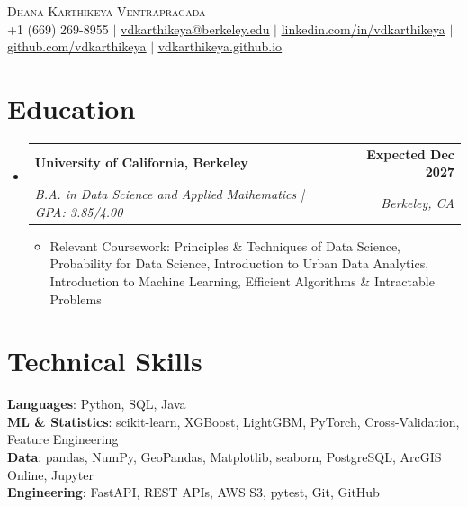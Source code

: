 \documentclass[letterpaper,11pt]{article}
\makeatletter
\newcommand{\resumeItem}[1]{%
  \item\small{{#1\vspace{-2pt}}}%
}
\newcommand{\resumeSubheading}[4]{
  \vspace{-2pt}\item
    \begin{tabular*}{1.0\textwidth}[t]{l@{\extracolsep{\fill}}r}
      \textbf{#1} & \textbf{\small #2} \\
      \textit{\small#3} & \textit{\small #4} \\
    \end{tabular*}\vspace{-7pt}
}
\newcommand{\resumeSubHeadingListStart}{\begin{itemize}[leftmargin=0.0in, label={}]}
\newcommand{\resumeSubHeadingListEnd}{\end{itemize}}
\newcommand{\resumeItemListStart}{\begin{itemize}[itemsep=2.5pt, topsep=3pt]}
\newcommand{\resumeItemListEnd}{\end{itemize}\vspace{-4pt}}
\makeatother
\begin{document}
\begin{center}
    {\Huge \scshape Dhana Karthikeya Ventrapragada} \\ \vspace{1pt}
        \footnotesize
    +1 (669) 269-8955 $|$
    \href{mailto:vdkarthikeya@berkeley.edu}{\uline{vdkarthikeya@berkeley.edu}} $|$
    \href{https://www.linkedin.com/in/vdkarthikeya/}{\uline{linkedin.com/in/vdkarthikeya}} $|$
    \href{https://github.com/vdkarthikeya}{\uline{github.com/vdkarthikeya}} $|$
    \href{https://vdkarthikeya.github.io}{\uline{vdkarthikeya.github.io}}
    \vspace{-8pt}
\end{center}

\section{Education}
\resumeSubHeadingListStart

\resumeSubheading
{University of California, Berkeley}{Expected Dec 2027}
{B.A. in Data Science and Applied Mathematics \;|\; GPA: 3.85/4.00}{Berkeley, CA}

\vspace{-6pt}
\resumeItemListStart
\resumeItem{Relevant Coursework: Principles \& Techniques of Data Science, Probability for Data Science, Introduction to Urban Data Analytics, Introduction to Machine Learning, Efficient Algorithms \& Intractable Problems}
\resumeItemListEnd

\resumeSubHeadingListEnd
\vspace{-14pt}

\section{Technical Skills}
 \begin{itemize}[leftmargin=0.15in, label={}, itemsep=3pt]
    \small{\item{
     \textbf{Languages}{: Python, SQL, Java} \\[2pt]
     \textbf{ML \& Statistics}{: scikit-learn, XGBoost, LightGBM, PyTorch, Cross-Validation, Feature Engineering} \\[2pt]
     \textbf{Data}{: pandas, NumPy, GeoPandas, Matplotlib, seaborn, PostgreSQL, ArcGIS Online, Jupyter} \\[2pt]
     \textbf{Engineering}{: FastAPI, REST APIs, AWS S3, pytest, Git, GitHub}
    }}
 \end{itemize}
 \vspace{-15pt}
\end{document}
